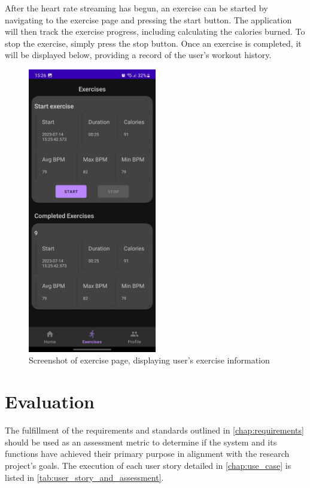 After the heart rate streaming has begun, an exercise can be started by navigating to the exercise page and pressing the start button.
The application will then track the exercise progress, including calculating the calories burned. 
To stop the exercise, simply press the stop button. Once an exercise is completed, it will be displayed below, providing a record of the user's workout history.
\begin{figure}[H]
    \centering
    \includegraphics[width=0.5\textwidth]{images/exercise-tracking-sc.jpeg}
    \caption{Screenshot of exercise page, displaying user's exercise information}
    \label{fig:exercise_screenshot}
\end{figure}



\section{Evaluation}
The fulfillment of the requirements and standards outlined in \autoref{chap:requirements} should be used as an assessment metric to determine if the system and its functions have achieved their primary purpose in alignment with the research project's goals. 
The execution of each user story detailed in \autoref{chap:use_case} is listed in \autoref{tab:user_story_and_assessment}.

